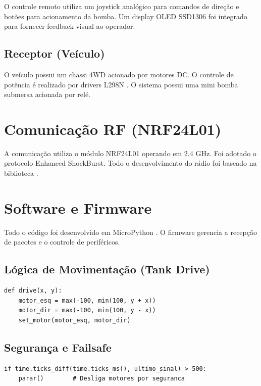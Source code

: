 \documentclass[
	12pt,				
	openright,			
	oneside,			
	a4paper,			
	english,			
	brazilian			
	]{abntex2}
\begin{document}
O controle remoto utiliza um joystick analógico para comandos de direção e botões para acionamento da bomba. Um display OLED SSD1306 foi integrado para fornecer feedback visual ao operador.

\subsection{Receptor (Veículo)}

O veículo possui um chassi 4WD acionado por motores DC. O controle de potência é realizado por drivers L298N \cite{l298n:datasheet}. O sistema possui uma mini bomba submersa acionada por relé.

\section{Comunicação RF (NRF24L01)}

A comunicação utiliza o módulo NRF24L01 \cite{nrf24l01:product} operando em 2.4 GHz. Foi adotado o protocolo Enhanced ShockBurst. Todo o desenvolvimento do rádio foi baseado na biblioteca \cite{nrf24l01:library}.

\section{Software e Firmware}

Todo o código foi desenvolvido em MicroPython \cite{micropython:docs}. O firmware gerencia a recepção de pacotes e o controle de periféricos.

\subsection{Lógica de Movimentação (Tank Drive)}

\begin{lstlisting}[caption={Algoritmo de Tank Drive em MicroPython}]
def drive(x, y):
    motor_esq = max(-100, min(100, y + x))
    motor_dir = max(-100, min(100, y - x))
    set_motor(motor_esq, motor_dir)
\end{lstlisting}

\subsection{Segurança e Failsafe}

\begin{lstlisting}[caption={Logica de Watchdog}]
if time.ticks_diff(time.ticks_ms(), ultimo_sinal) > 500:
    parar()        # Desliga motores por seguranca
\end{lstlisting}
\end{document}

